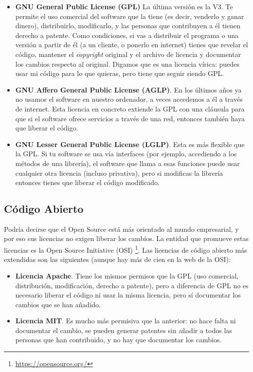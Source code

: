 \begin{itemize}

\item \textbf{GNU General Public License (GPL)} La última versión es la V3. Te permite el uso comercial del software que la tiene (es decir, venderlo y ganar dinero), distribuirlo, modificarlo, y las personas que contribuyen a él tienen derecho a patente. Como condiciones, si vas a distribuir el programa o una versión a partir de él (a un cliente, o ponerlo en internet) tienes que revelar el código, mantener el \textit{copyright} original y el archivo de licencia y documentar los cambios respecto al original. Digamos que es una licencia vírica: puedes usar mi código para lo que quieras, pero tiene que seguir siendo GPL.

\item \textbf{GNU Affero General Public License (AGLP)}. En los últimos años ya no usamos el software en nuestro ordenador, a veces accedemos a él a través de internet. Esta licencia en concreto extiende la GPL con una cláusula para que si el software ofrece servicios a través de una red, entonces también haya que liberar el código.

\item \textbf{GNU Lesser General Public License (LGLP)}. Esta es más flexible que la GPL. Si tu software se usa vía interfaces (por ejemplo, accediendo a los métodos de una librería), el software que llama a esas funciones puede usar cualquier otra licencia (incluso privativa), pero si modificas la librería entonces tienes que liberar el código modificado.

\end{itemize}

\subsection{Código Abierto}
Podría decirse que el Open Source está más orientado al mundo empresarial, y por eso sus licencias no exigen liberar los cambios. La entidad que promueve estas licencias es la Open Source Initiative (OSI) \footnote{\url{https://opensource.org/}}. Las licencias de código abierto más extendidas son las siguientes (aunque hay más de cien en la web de la OSI):

\begin{itemize}
   
\item \textbf{Licencia Apache}. Tiene los mismos permisos que la GPL (uso comercial, distribución, modificación, derecho a patente), pero a diferencia de GPL no es necesario liberar el código ni usar la misma licencia, pero sí documentar los cambios que se han añadido.

\item \textbf{Licencia MIT}. Es mucho más permisiva que la anterior: no hace falta ni documentar el cambio, se pueden generar patentes sin añadir a todos las personas que han contribuido, y no hay que documentar los cambios.

\end{itemize}

